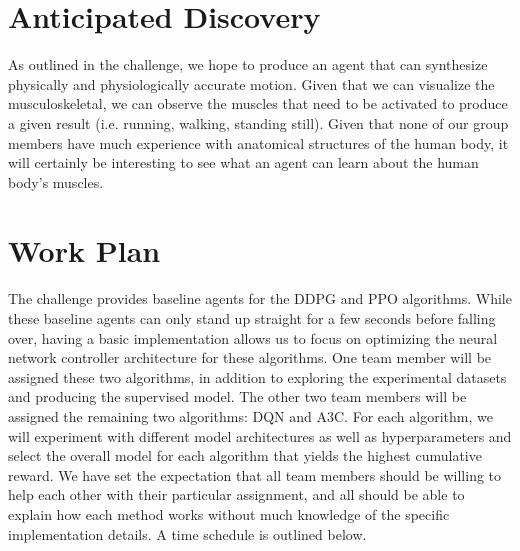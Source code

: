 \documentclass[journal,onecolumn]{IEEEtran}
\begin{document}
\section{Anticipated Discovery}
As outlined in the challenge, we hope to produce an agent that can synthesize physically and physiologically accurate motion. Given that we can visualize the musculoskeletal, we can observe the muscles that need to be activated to produce a given result (i.e. running, walking, standing still). Given that none of our group members have much experience with anatomical structures of the human body, it will certainly be interesting to see what an agent can learn about the human body's muscles. 
\section{Work Plan}
The challenge provides baseline agents for the DDPG and PPO algorithms. While these baseline agents can only stand up straight for a few seconds before falling over, having a basic implementation allows us to focus on optimizing the neural network controller architecture for these algorithms. One team member will be assigned these two algorithms, in addition to exploring the experimental datasets and producing the supervised model. The other two team members will be assigned the remaining two algorithms: DQN and A3C. For each algorithm, we will experiment with different model architectures as well as hyperparameters and select the overall model for each algorithm that yields the highest cumulative reward. We have set the expectation that all team members should be willing to help each other with their particular assignment, and all should be able to explain how each method works without much knowledge of the specific implementation details. A time schedule is outlined below.
\end{document}
